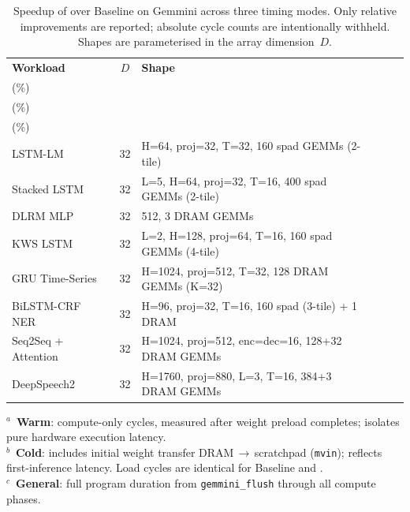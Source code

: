 \begin{table}[t]
\centering
\caption{Speedup of \pipette{} over Baseline on Gemmini across three
         timing modes. Only relative improvements are reported; absolute
         cycle counts are intentionally withheld. Shapes are parameterised
         in the array dimension~$D$.}
\label{tab:benchmark_results}
\small
\setlength{\tabcolsep}{5pt}
\renewcommand{\arraystretch}{1.15}
\begin{tabular}{@{} l c l rrr @{}}
\toprule
\textbf{Workload} & \textbf{$D$} & \textbf{Shape}
 & \shortstack{Warm$^{a}$\\(\%)}
 & \shortstack{Cold$^{b}$\\(\%)}
 & \shortstack{General$^{c}$\\(\%)} \\
\midrule
LSTM-LM~\cite{sak_long_2014}
  & 32 & H=64, proj=32, T=32, 160 spad GEMMs (2-tile)
  & & & \\
Stacked LSTM~\cite{sak_long_2014}
  & 32 & L=5, H=64, proj=32, T=16, 400 spad GEMMs (2-tile)
  & & & \\
DLRM MLP~\cite{naumov_deep_2019}
  & 32 & 512\textrightarrow 256\textrightarrow 64\textrightarrow 32, 3 DRAM GEMMs
  & & & \\
KWS LSTM~\cite{arik_convolutional_2017}
  & 32 & L=2, H=128, proj=64, T=16, 160 spad GEMMs (4-tile)
  & & & \\
GRU Time-Series~\cite{cho_learning_2014}
  & 32 & H=1024, proj=512, T=32, 128 DRAM GEMMs (K=32)
  & & & \\
BiLSTM-CRF NER~\cite{lample_neural_2016}
  & 32 & H=96, proj=32, T=16, 160 spad (3-tile) + 1 DRAM
  & & & \\
Seq2Seq + Attention~\cite{bahdanau_neural_2016}
  & 32 & H=1024, proj=512, enc=dec=16, 128+32 DRAM GEMMs
  & & & \\
DeepSpeech2~\cite{amodei2016deep}
  & 32 & H=1760, proj=880, L=3, T=16, 384+3 DRAM GEMMs
  & & & \\
\bottomrule
\end{tabular}
\par\smallskip
\begin{minipage}{\linewidth}
\footnotesize
$^{a}$~\textbf{Warm}: compute-only cycles, measured after weight preload completes;
isolates pure hardware execution latency.\quad \\
$^{b}$~\textbf{Cold}: includes initial weight transfer DRAM\,$\to$\,scratchpad
(\texttt{mvin}); reflects first-inference latency. Load cycles are identical for
Baseline and \pipette{}.\quad \\
$^{c}$~\textbf{General}: full program duration from \texttt{gemmini\_flush} through
all compute phases.
\end{minipage}
\end{table}
